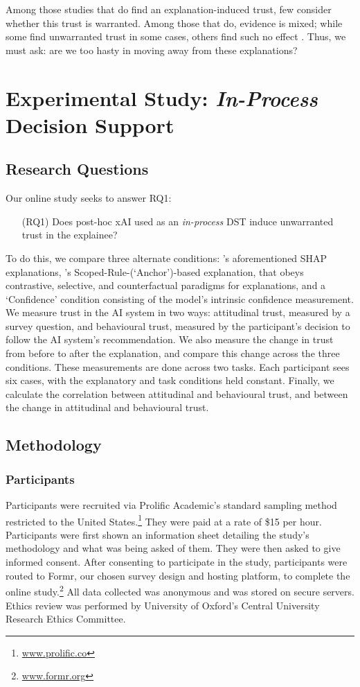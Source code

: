 Among those studies that do find an explanation-induced trust, few consider whether this trust is warranted. Among those that do, evidence is mixed; while some find unwarranted trust in some cases, others find such no effect \cite{Lai-and-Tan,Jacobs-et-al}. Thus, we must ask: are we too hasty in moving away from these explanations? 

\section{Experimental Study: \emph{In-Process} Decision Support}\label{sec:online}
\subsection{Research Questions}
Our online study seeks to answer RQ1:

\begin{enumerate}
    \item[(RQ1)] Does post-hoc xAI used as an \emph{in-process} DST induce unwarranted trust in the explainee?
\end{enumerate}

To do this, we compare three alternate conditions: \textcite{Lundberg-and-Lee}'s aforementioned SHAP explanations, \textcite{Ribeiro-et-al-anchors}'s Scoped-Rule-(`Anchor')-based explanation, that obeys contrastive, selective, and counterfactual paradigms for explanations, and a `Confidence' condition consisting of the model's intrinsic confidence measurement. We measure trust in the AI system in two ways: attitudinal trust, measured by a survey question, and behavioural trust, measured by the participant's decision to follow the AI system's recommendation. We also measure the change in trust from before to after the explanation, and compare this change across the three conditions. These measurements are done across two tasks. Each participant sees six cases, with the explanatory and task conditions held constant. Finally, we calculate the correlation between attitudinal and behavioural trust, and between the change in attitudinal and behavioural trust.

\subsection{Methodology}
\subsubsection{Participants}
Participants were recruited via Prolific Academic's standard sampling method restricted to the United States.\footnote{\url{www.prolific.co}} They were paid at a rate of \$15 per hour. Participants were first shown an information sheet detailing the study's methodology and what was being asked of them. They were then asked to give informed consent. After consenting to participate in the study, participants were routed to Formr, our chosen survey design and hosting platform, to complete the online study.\footnote{\url{www.formr.org}} All data collected was anonymous and was stored on secure servers. Ethics review was performed by University of Oxford's Central University Research Ethics Committee.

